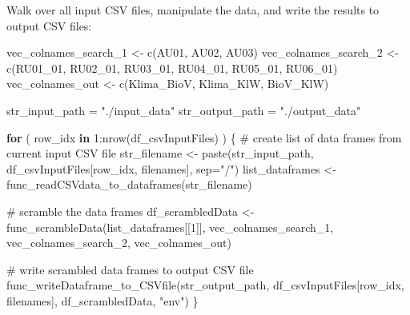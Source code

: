 \documentclass[
]{article}
\newenvironment{Shaded}{\begin{snugshade}}{\end{snugshade}}
\newcommand{\AttributeTok}[1]{\textcolor[rgb]{0.00,0.34,0.68}{#1}}
\newcommand{\CommentTok}[1]{\textcolor[rgb]{0.54,0.53,0.53}{#1}}
\newcommand{\ControlFlowTok}[1]{\textcolor[rgb]{0.12,0.11,0.11}{\textbf{#1}}}
\newcommand{\DecValTok}[1]{\textcolor[rgb]{0.69,0.50,0.00}{#1}}
\newcommand{\FunctionTok}[1]{\textcolor[rgb]{0.39,0.29,0.61}{#1}}
\newcommand{\NormalTok}[1]{\textcolor[rgb]{0.12,0.11,0.11}{#1}}
\newcommand{\OtherTok}[1]{\textcolor[rgb]{0.00,0.43,0.16}{#1}}
\newcommand{\SpecialCharTok}[1]{\textcolor[rgb]{0.24,0.68,0.91}{#1}}
\newcommand{\StringTok}[1]{\textcolor[rgb]{0.75,0.01,0.01}{#1}}
\begin{document}
Walk over all input CSV files, manipulate the data, and write the
results to output CSV files:

\begin{Shaded}
\begin{Highlighting}[]
\NormalTok{vec\_colnames\_search\_1 }\OtherTok{\textless{}{-}} \FunctionTok{c}\NormalTok{(}\StringTok{\textquotesingle{}AU01\textquotesingle{}}\NormalTok{, }\StringTok{\textquotesingle{}AU02\textquotesingle{}}\NormalTok{, }\StringTok{\textquotesingle{}AU03\textquotesingle{}}\NormalTok{)}
\NormalTok{vec\_colnames\_search\_2 }\OtherTok{\textless{}{-}} \FunctionTok{c}\NormalTok{(}\StringTok{\textquotesingle{}RU01\_01\textquotesingle{}}\NormalTok{, }\StringTok{\textquotesingle{}RU02\_01\textquotesingle{}}\NormalTok{, }\StringTok{\textquotesingle{}RU03\_01\textquotesingle{}}\NormalTok{, }\StringTok{\textquotesingle{}RU04\_01\textquotesingle{}}\NormalTok{, }\StringTok{\textquotesingle{}RU05\_01\textquotesingle{}}\NormalTok{, }\StringTok{\textquotesingle{}RU06\_01\textquotesingle{}}\NormalTok{)}
\NormalTok{vec\_colnames\_out }\OtherTok{\textless{}{-}} \FunctionTok{c}\NormalTok{(}\StringTok{\textquotesingle{}Klima\_BioV\textquotesingle{}}\NormalTok{, }\StringTok{\textquotesingle{}Klima\_KlW\textquotesingle{}}\NormalTok{, }\StringTok{\textquotesingle{}BioV\_KlW\textquotesingle{}}\NormalTok{)}

\NormalTok{str\_input\_path }\OtherTok{=} \StringTok{"./input\_data"}
\NormalTok{str\_output\_path }\OtherTok{=} \StringTok{"./output\_data"}

\ControlFlowTok{for}\NormalTok{ ( row\_idx }\ControlFlowTok{in} \DecValTok{1}\SpecialCharTok{:}\FunctionTok{nrow}\NormalTok{(df\_csvInputFiles) ) \{}
  \CommentTok{\# create list of data frames from current input CSV file}
\NormalTok{  str\_filename }\OtherTok{\textless{}{-}} \FunctionTok{paste}\NormalTok{(str\_input\_path, df\_csvInputFiles[row\_idx, filenames], }\AttributeTok{sep=}\StringTok{"/"}\NormalTok{)}
\NormalTok{  list\_dataframes }\OtherTok{\textless{}{-}} \FunctionTok{func\_readCSVdata\_to\_dataframes}\NormalTok{(str\_filename)}
  
  \CommentTok{\# scramble the data frames}
\NormalTok{  df\_scrambledData }\OtherTok{\textless{}{-}} \FunctionTok{func\_scrambleData}\NormalTok{(list\_dataframes[[}\DecValTok{1}\NormalTok{]], vec\_colnames\_search\_1, vec\_colnames\_search\_2, vec\_colnames\_out)}
  
  \CommentTok{\# write scrambled data frames to output CSV file}
  \FunctionTok{func\_writeDataframe\_to\_CSVfile}\NormalTok{(str\_output\_path, df\_csvInputFiles[row\_idx, filenames], df\_scrambledData, }\StringTok{"env"}\NormalTok{)}
\NormalTok{\}}
\end{Highlighting}
\end{Shaded}
\end{document}
